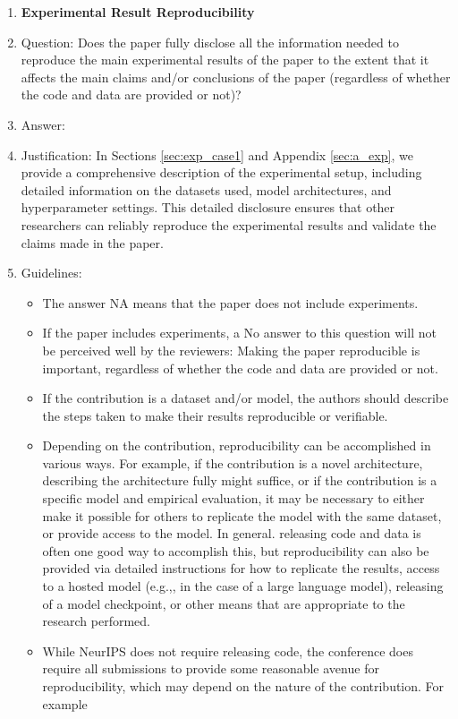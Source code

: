 \documentclass{article}
\theoremstyle{plain}
\theoremstyle{definition}
\theoremstyle{remark}
\begin{document}
\begin{enumerate}
    \item {\bf Experimental Result Reproducibility}
    \item[] Question: Does the paper fully disclose all the information needed to reproduce the main experimental results of the paper to the extent that it affects the main claims and/or conclusions of the paper (regardless of whether the code and data are provided or not)?
    \item[] Answer: \answerYes{} %
    \item[] Justification: In Sections \ref{sec:exp_case1} and Appendix \ref{sec:a_exp}, we provide a comprehensive description of the experimental setup, including detailed information on the datasets used, model architectures, and hyperparameter settings. This detailed disclosure ensures that other researchers can reliably reproduce the experimental results and validate the claims made in the paper.
    \item[] Guidelines:
    \begin{itemize}
        \item The answer NA means that the paper does not include experiments.
        \item If the paper includes experiments, a No answer to this question will not be perceived well by the reviewers: Making the paper reproducible is important, regardless of whether the code and data are provided or not.
        \item If the contribution is a dataset and/or model, the authors should describe the steps taken to make their results reproducible or verifiable. 
        \item Depending on the contribution, reproducibility can be accomplished in various ways. For example, if the contribution is a novel architecture, describing the architecture fully might suffice, or if the contribution is a specific model and empirical evaluation, it may be necessary to either make it possible for others to replicate the model with the same dataset, or provide access to the model. In general. releasing code and data is often one good way to accomplish this, but reproducibility can also be provided via detailed instructions for how to replicate the results, access to a hosted model (e.g.,, in the case of a large language model), releasing of a model checkpoint, or other means that are appropriate to the research performed.
        \item While NeurIPS does not require releasing code, the conference does require all submissions to provide some reasonable avenue for reproducibility, which may depend on the nature of the contribution. For example

\end{itemize}
\end{enumerate}
\end{document}
